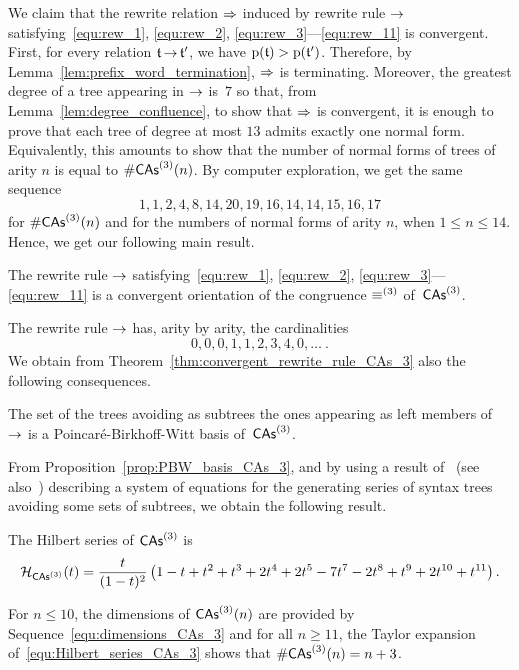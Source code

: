 \noindent
We claim that the rewrite relation $\operatorname{\Rightarrow}$ induced by
rewrite rule $\operatorname{\to}$ satisfying~\eqref{equ:rew_1}, \eqref{equ:rew_2},
\eqref{equ:rew_3}---\eqref{equ:rew_11} is convergent. First, for every
relation $\mathfrak{t} \operatorname{\to} \mathfrak{t}'$, we have
$\mathrm{p}(\mathfrak{t}) > \mathrm{p}(\mathfrak{t}')$. Therefore, by
Lemma~\ref{lem:prefix_word_termination}, $\operatorname{\Rightarrow}$ is terminating.
Moreover, the greatest degree of a tree appearing in $\operatorname{\to}$ is~$7$ so
that, from Lemma~\ref{lem:degree_confluence}, to show that $\operatorname{\Rightarrow}$
is convergent, it is enough to prove that each tree of degree at most
$13$ admits exactly one normal form. Equivalently, this amounts to
show that the number of normal forms of trees of arity $n$ is equal
to $\#\mathsf{CAs}^{\left(3\right)}(n)$. By computer exploration, we get the same sequence
\begin{equation} \label{equ:dimensions_CAs_3}
    1, 1, 2, 4, 8, 14, 20, 19, 16, 14, 14, 15, 16, 17
\end{equation}
for $\#\mathsf{CAs}^{\left(3\right)}(n)$ and for the numbers of normal forms of arity $n$,
when $ 1 \leq n \leq 14$. Hence, we get our following main result.
\medbreak

\begin{Theorem} \label{thm:convergent_rewrite_rule_CAs_3}
    The rewrite rule $\operatorname{\to}$ satisfying~\eqref{equ:rew_1},
    \eqref{equ:rew_2}, \eqref{equ:rew_3}---\eqref{equ:rew_11} is a
    convergent orientation of the congruence $\operatorname{\equiv}^{(3)}$
    of~$\mathsf{CAs}^{\left(3\right)}$.
\end{Theorem}
\medbreak

The rewrite rule $\operatorname{\to}$ has, arity by arity, the cardinalities
\begin{equation}
    0, 0, 0, 1, 1, 2, 3, 4, 0, \dots~.
\end{equation}
We obtain from Theorem~\ref{thm:convergent_rewrite_rule_CAs_3} also
the following consequences.
\medbreak

\begin{Proposition} \label{prop:PBW_basis_CAs_3}
    The set of the trees avoiding as subtrees the ones appearing as
    left members of $\operatorname{\to}$ is a Poincaré-Birkhoff-Witt basis
    of~$\mathsf{CAs}^{\left(3\right)}$.
\end{Proposition}
\medbreak

From Proposition~\ref{prop:PBW_basis_CAs_3}, and by using a result
of~\cite{Gir18} (see also~\cite{Row10,KP15}) describing a system of
equations for the generating series of syntax trees avoiding some sets
of subtrees, we obtain the following result.
\medbreak

\begin{Proposition} \label{prop:Hilbert_series_CAs_3}
    The Hilbert series of $\mathsf{CAs}^{\left(3\right)}$ is
    \begin{equation} \label{equ:Hilbert_series_CAs_3}
        \mathcal{H}_{\mathsf{CAs}^{\left(3\right)}}(t) = \frac{t}{(1 - t)^2}
        \left(1 - t + t^2 + t^3 + 2t^4 + 2t^5 - 7t^7 - 2t^8 + t^9 +
        2t^{10} + t^{11}\right).
    \end{equation}
\end{Proposition}
\medbreak

For $n \leq 10$, the dimensions of $\mathsf{CAs}^{\left(3\right)}(n)$ are provided by
Sequence~\eqref{equ:dimensions_CAs_3} and for all $n \geq 11$, the
Taylor expansion of~\eqref{equ:Hilbert_series_CAs_3} shows that
$\# \mathsf{CAs}^{\left(3\right)}(n) = n + 3$.
\medbreak
